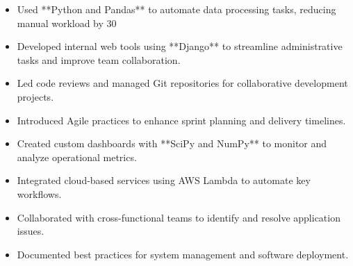 \par\smallskip
\noindent
\begin{minipage}{20cm}
  \begin{minipage}{9.75cm}
    \begin{itemize}
      \item Used **Python and Pandas** to automate data processing tasks, reducing manual workload by 30%
      \item Developed internal web tools using **Django** to streamline administrative tasks and improve team collaboration.
    \end{itemize}
  \end{minipage}
  \hfill
  \begin{minipage}{9.75cm}
    \begin{itemize}
      \item Led code reviews and managed Git repositories for collaborative development projects.
      \item Introduced Agile practices to enhance sprint planning and delivery timelines.
    \end{itemize}
  \end{minipage}
\end{minipage}
\par\smallskip
\divider

\par\smallskip
\noindent
\begin{minipage}{20cm}
  \begin{minipage}{9.75cm}
    \begin{itemize}
      \item Created custom dashboards with **SciPy and NumPy** to monitor and analyze operational metrics.
      \item Integrated cloud-based services using AWS Lambda to automate key workflows.
    \end{itemize}
  \end{minipage}
  \hfill
  \begin{minipage}{9.75cm}
    \begin{itemize}
      \item Collaborated with cross-functional teams to identify and resolve application issues.
      \item Documented best practices for system management and software deployment.
    \end{itemize}
  \end{minipage}
\end{minipage}

